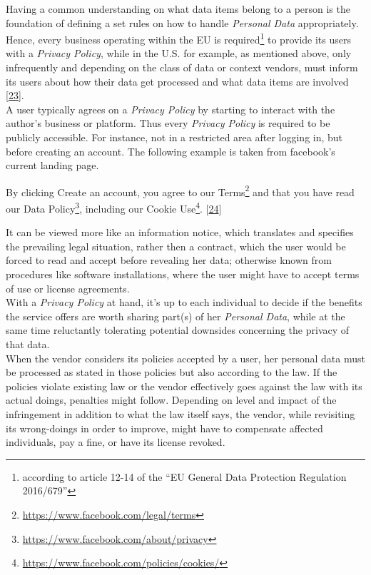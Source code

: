 \documentclass[12pt,english,a4paper,titlepage,cleardoublepage=empty,dottedtoc]{report}
\renewcommand{\href}[2]{#2\footnote{\url{#1}}}
\let\origquote\quote
\let\endorigquote\endquote
\renewenvironment{quote}{%
    \origquote
    \itshape
}
{\endorigquote}
\begin{document}
Having a common understanding on what data items belong to a person is
the foundation of defining a set rules on how to handle \emph{Personal
Data} appropriately. Hence, every business operating within the EU is
required\footnote{according to article 12-14 of the ``EU General Data
  Protection Regulation 2016/679''} to provide its users with a
\emph{Privacy Policy}, while in the U.S. for example, as mentioned
above, only infrequently and depending on the class of data or context
vendors, must inform its users about how their data get processed and
what data items are involved
{[}\protect\hyperlink{ref-web_2016_privacy-policies-are-mandatory-by-law}{23}{]}.\\
A user typically agrees on a \emph{Privacy Policy} by starting to
interact with the author's business or platform. Thus every
\emph{Privacy Policy} is required to be publicly accessible. For
instance, not in a restricted area after logging in, but before creating
an account. The following example is taken from facebook's current
landing page.

\begin{quote}
By clicking Create an account, you agree to our
\href{https://www.facebook.com/legal/terms}{Terms} and that you have
read our \href{https://www.facebook.com/about/privacy}{Data Policy},
including our \href{https://www.facebook.com/policies/cookies/}{Cookie
Use}.
{[}\protect\hyperlink{ref-web_2016_facebooks-landing-page_policy-acknowledgement}{24}{]}
\end{quote}

It can be viewed more like an information notice, which translates and
specifies the prevailing legal situation, rather then a contract, which
the user would be forced to read and accept before revealing her data;
otherwise known from procedures like software installations, where the
user might have to accept terms of use or license agreements.\\
With a \emph{Privacy Policy} at hand, it's up to each individual to
decide if the benefits the service offers are worth sharing part(s) of
her \emph{Personal Data}, while at the same time reluctantly tolerating
potential downsides concerning the privacy of that data.\\
When the vendor considers its policies accepted by a user, her personal
data must be processed as stated in those policies but also according to
the law. If the policies violate existing law or the vendor effectively
goes against the law with its actual doings, penalties might follow.
Depending on level and impact of the infringement in addition to what
the law itself says, the vendor, while revisiting its wrong-doings in
order to improve, might have to compensate affected individuals, pay a
fine, or have its license revoked.
\end{document}
